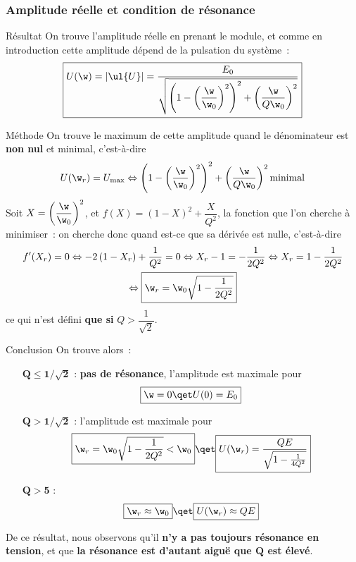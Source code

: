 \documentclass[../main/main.tex]{subfiles}
\begin{document}
\subsubsection{Amplitude réelle et condition de résonance}
\begin{rprop}{Résultat}
    On trouve l'amplitude réelle en prenant le module, et comme en introduction
    cette amplitude dépend de la pulsation du système~:
    \[\boxed{
            U(\w)
            = \left| \ul{U} \right|
            = \frac{E_0}{
                \sqrt{\left( 1 - \left(\dfrac{\w}{\w_0}\right)^2 \right)^2
                + \left(\dfrac{\w}{Q\w_0}\right)^2}}
    }\]
\end{rprop}
\begin{rdemo}{Méthode}
    On trouve le maximum de cette amplitude quand le dénominateur est
    \textbf{non nul} et minimal, c'est-à-dire
    \begin{gather*}
        U(\w_r) = U_{\max}
        \Leftrightarrow
        \left( 1 - \left(\dfrac{\w}{\w_0}\right)^2 \right)^2
                + \left(\dfrac{\w}{Q\w_0}\right)^2 \text{minimal}
    \end{gather*}
    Soit $X = \left( \dfrac{\w}{\w_0} \right)^2$, et $f(X) = \left(1 - X\right)^2
    + \dfrac{X}{Q^2}$, la fonction que l'on cherche à minimiser~: on cherche donc
    quand est-ce que sa dérivée est nulle, c'est-à-dire
    \begin{gather*}
        f'(X_r) = 0
        \Leftrightarrow
        -2 \left( 1-X_r \right) + \frac{1}{Q^2} = 0
        \Leftrightarrow
        X_r-1 = - \frac{1}{2Q^2}
        \Leftrightarrow
        X_r = 1 - \frac{1}{2Q^2}\\
        \Leftrightarrow
        \boxed{
        \w_r = \w_0 \sqrt{1 - \frac{1}{2Q^2}}}
    \end{gather*}
    ce qui n'est défini \textbf{que si} $Q > \dfrac{1}{\sqrt{2}}$.
\end{rdemo}
\begin{rror}{Conclusion}
    On trouve alors~:
    \begin{itemize}[leftmargin=60pt]
        \item[$\mathbf{Q \leq 1/\sqrt{2}}$] : \textbf{pas de résonance},
            l'amplitude est maximale pour
            \[\boxed{\w = 0 \qet U(0) = E_0}\]
        \item[$\mathbf{Q > 1/\sqrt{2}}$] : l'amplitude est maximale pour
            \[\boxed{\w_r = \w_0 \sqrt{1 - \frac{1}{2Q^2}} < \w_0}
                \qet
                \boxed{U(\w_r) = \frac{QE}{\sqrt{1 - \frac{1}{4Q^2}}}}
            \]
        \item[$\mathbf{Q > 5}$] :
            \[\boxed{\w_r \approx \w_0}
                \qet
                \boxed{U(\w_r) \approx QE}
            \]
    \end{itemize}
    De ce résultat, nous observons qu'il \textbf{n'y a pas toujours résonance en
    tension}, et que \textbf{la résonance est d'autant aiguë que $\mathbf{Q}$
    est élevé}.
\end{rror}
\end{document}
